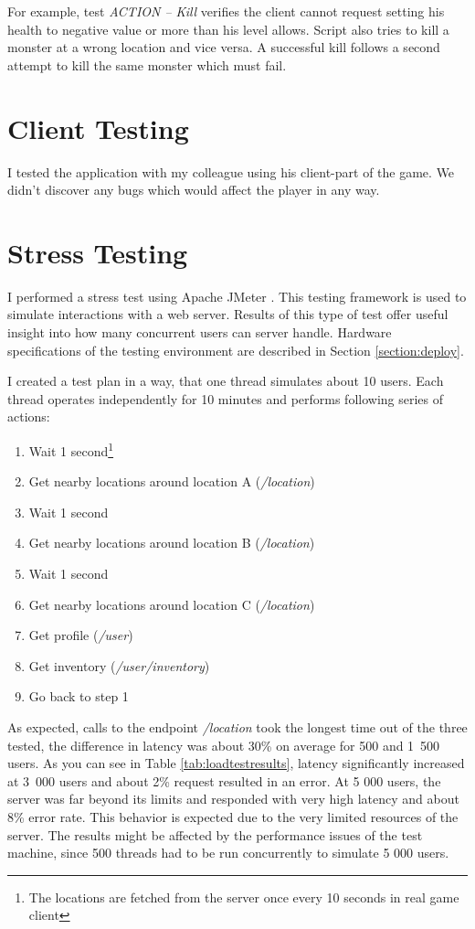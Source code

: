 For example, test \textit{ACTION -- Kill} verifies the client cannot request setting his health to negative value or more than his level allows. Script also tries to kill a monster at a wrong location and vice versa. A successful kill follows a second attempt to kill the same monster which must fail. 


\section{Client Testing}
I tested the application with my colleague using his client-part of the game. We didn't discover any bugs which would affect the player in any way.

\section{Stress Testing}
I performed a stress test using Apache JMeter \cite{jmeter}. This testing framework is used to simulate interactions with a web server. Results of this type of test offer useful insight into how many concurrent users can server handle. Hardware specifications of the testing environment are described in Section \ref{section:deploy}.

I created a test plan in a way, that one thread simulates about 10 users. Each thread operates independently for 10 minutes and performs following series of actions:
\begin{enumerate}
	\item Wait 1 second\footnote{The locations are fetched from the server once every 10 seconds in real game client}
	\item Get nearby locations around location A (\textit{/location})
	\item Wait 1 second
	\item Get nearby locations around location B (\textit{/location})
	\item Wait 1 second
	\item Get nearby locations around location C (\textit{/location})
	\item Get profile (\textit{/user})
	\item Get inventory (\textit{/user/inventory})
	\item Go back to step 1
\end{enumerate}

As expected, calls to the endpoint \textit{/location} took the longest time out of the three tested, the difference in latency was about 30\% on average for 500 and 1~500 users. As you can see in Table \ref{tab:loadtestresults}, latency significantly increased at 3~000 users and about 2\% request resulted in an error. At 5 000 users, the server was far beyond its limits and responded with very high latency and about 8\% error rate. This behavior is expected due to the very limited resources of the server. The results might be affected by the performance issues of the test machine, since 500 threads had to be run concurrently to simulate 5 000 users.

